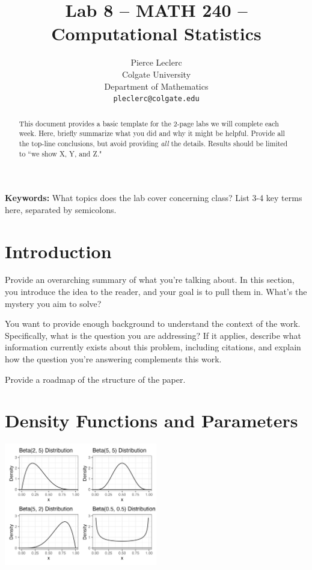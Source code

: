 \documentclass{article}\usepackage[]{graphicx}\usepackage[]{xcolor}
\newenvironment{Figure}
  {\par\medskip\noindent\minipage{\linewidth}}
  {\endminipage\par\medskip}
\begin{document}
\vspace{-1in}
\title{Lab 8 -- MATH 240 -- Computational Statistics}

\author{
  Pierce Leclerc \\
  Colgate University  \\
  Department of Mathematics  \\
  {\tt pleclerc@colgate.edu}
}

\date{}

\maketitle

\begin{multicols}{2}
\begin{abstract}
This document provides a basic template for the 2-page labs we will complete each week. Here, briefly summarize what you did and why it might be helpful. Provide all the top-line conclusions, but avoid providing \emph{all} the details. Results should be limited to ``we show X, Y, and Z."
\end{abstract}

\noindent \textbf{Keywords:} What topics does the lab cover concerning class? List 3-4 key terms here, separated by semicolons.

\section{Introduction}
Provide an overarching summary of what you're talking about. In this section, you introduce the idea to the reader, and your goal is to pull them in. What's the mystery you aim to solve?

You want to provide enough background to understand the context of the work. Specifically, what is the question you are addressing? If it applies, describe what information currently exists about this problem, including citations, and explain how the question you're answering complements this work.

Provide a roadmap of the structure of the paper. 

\section{Density Functions and Parameters}

\begin{Figure}
\begin{center}
  \includegraphics[width=0.5\textwidth]{task1.png}
\end{center}
\end{Figure}


\end{multicols}
\end{document}
